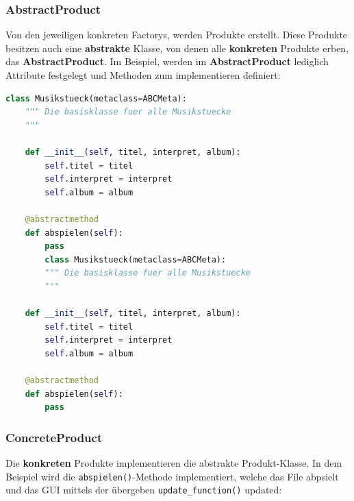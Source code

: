 \subsubsection{AbstractProduct}
Von den jeweiligen konkreten Factorys, werden Produkte erstellt. Diese Produkte besitzen auch eine \textbf{abstrakte} Klasse, von denen alle \textbf{konkreten} Produkte erben, das \textbf{AbstractProduct}. Im Beispiel, werden im \textbf{AbstractProduct} lediglich Attribute festgelegt und Methoden zum implementieren definiert:


\begin{lstlisting}[language=python]
class Musikstueck(metaclass=ABCMeta):
	""" Die basisklasse fuer alle Musikstuecke
	"""
	
	def __init__(self, titel, interpret, album):
		self.titel = titel
		self.interpret = interpret
		self.album = album
	
	@abstractmethod
	def abspielen(self):
		pass
		class Musikstueck(metaclass=ABCMeta):
		""" Die basisklasse fuer alle Musikstuecke
		"""
	
	def __init__(self, titel, interpret, album):
		self.titel = titel
		self.interpret = interpret
		self.album = album
	
	@abstractmethod
	def abspielen(self):
		pass

\end{lstlisting}

\subsubsection{ConcreteProduct}
Die \textbf{konkreten} Produkte implementieren die abstrakte Produkt-Klasse. In dem Beispiel wird die \verb|abspielen()|-Methode implementiert, welche das File abpsielt und das GUI mittels der übergeben \verb|update_function()| updated:

